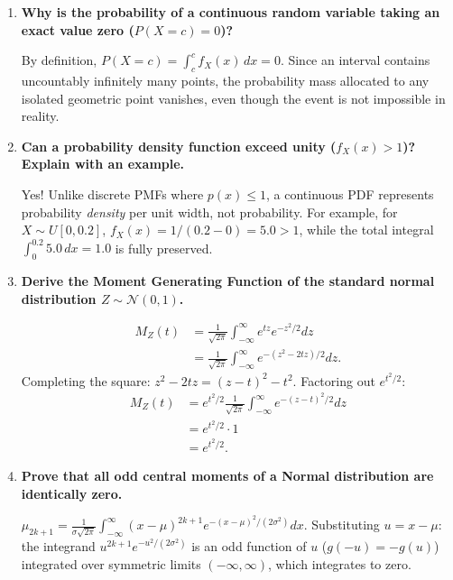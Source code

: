 \documentclass[12pt,a4paper]{article}
\newcommand{\Q}[1]{\textbf{#1}\par\noindent\ignorespaces}
\begin{document}
\begin{tcolorbox}[exambox, title={\textbf{Frequently Asked / Viva Questions}}]
\begin{enumerate}[topsep=0pt, label=\textbf{Q\arabic*.}, itemsep=5pt]
  \item \Q{Why is the probability of a continuous random variable taking an exact value zero ($P(X = c) = 0$)?}
  By definition, $P(X = c) = \int_c^c f_X(x) \, dx = 0$. Since an interval contains uncountably infinitely many points, the probability mass allocated to any isolated geometric point vanishes, even though the event is not impossible in reality.

  \item \Q{Can a probability density function exceed unity ($f_X(x) > 1$)? Explain with an example.}
  Yes! Unlike discrete PMFs where $p(x) \le 1$, a continuous PDF represents probability \textit{density} per unit width, not probability. For example, for $X \sim U[0, 0.2]$, $f_X(x) = 1/(0.2 - 0) = 5.0 > 1$, while the total integral $\int_0^{0.2} 5.0 \, dx = 1.0$ is fully preserved.

  \item \Q{Derive the Moment Generating Function of the standard normal distribution $Z \sim \mathcal{N}(0, 1)$.}

  \[
    \begin{aligned}
      M_Z(t) &= \frac{1}{\sqrt{2\pi}} \int_{-\infty}^\infty e^{tz} e^{-z^2/2} dz \\[3pt]
      &= \frac{1}{\sqrt{2\pi}} \int_{-\infty}^\infty e^{-(z^2 - 2tz)/2} dz.
    \end{aligned}
  \]
   Completing the square: $z^2 - 2tz = (z-t)^2 - t^2$. Factoring out $e^{t^2/2}$:
  \[
    \begin{aligned}
      M_Z(t) &= e^{t^2/2} \frac{1}{\sqrt{2\pi}} \int_{-\infty}^\infty e^{-(z-t)^2/2} dz \\[3pt]
      &= e^{t^2/2} \cdot 1 \\[3pt]
      &= e^{t^2/2}.
    \end{aligned}
  \]

  \item \Q{Prove that all odd central moments of a Normal distribution are identically zero.}
  $\mu_{2k+1} = \frac{1}{\sigma\sqrt{2\pi}} \int_{-\infty}^\infty (x-\mu)^{2k+1} e^{-(x-\mu)^2/(2\sigma^2)} dx$. Substituting $u = x - \mu$: the integrand $u^{2k+1} e^{-u^2/(2\sigma^2)}$ is an odd function of $u$ ($g(-u) = -g(u)$) integrated over symmetric limits $(-\infty, \infty)$, which integrates to zero.


\end{enumerate}
\end{tcolorbox}
\end{document}
